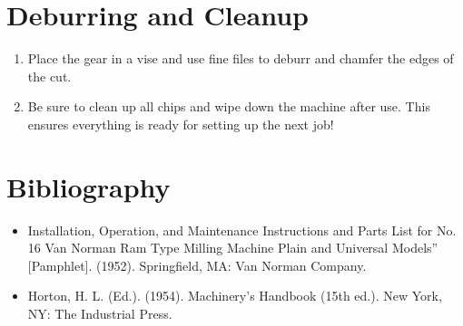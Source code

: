 \documentclass[12pt,twoside,letterpaper]{article}
\begin{document}
\section{Deburring and Cleanup}
\begin{enumerate}
\item Place the gear in a vise and use fine files to deburr and chamfer the edges of the cut.
\item Be sure to clean up all chips and wipe down the machine after use. This ensures everything is ready for setting up the next job!
\end{enumerate}


\section{Bibliography}

\begin{itemize}
	\item Installation, Operation, and Maintenance Instructions and Parts List for No. 16 Van Norman Ram Type Milling Machine Plain and Universal Models'' [Pamphlet]. (1952). Springfield, MA: Van Norman Company. 

	\item Horton, H. L. (Ed.). (1954). Machinery's Handbook (15th ed.). New York, NY: The Industrial Press. 

\end{itemize}
\end{document}
